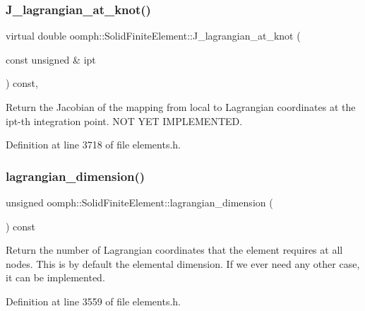\subsubsection{\texorpdfstring{J\+\_\+lagrangian\+\_\+at\+\_\+knot()}{J\_lagrangian\_at\_knot()}}
{\footnotesize\ttfamily virtual double oomph\+::\+Solid\+Finite\+Element\+::\+J\+\_\+lagrangian\+\_\+at\+\_\+knot (\begin{DoxyParamCaption}\item[{const unsigned \&}]{ipt }\end{DoxyParamCaption}) const\hspace{0.3cm}{\ttfamily [inline]}, {\ttfamily [virtual]}}



Return the Jacobian of the mapping from local to Lagrangian coordinates at the ipt-\/th integration point. N\+OT Y\+ET I\+M\+P\+L\+E\+M\+E\+N\+T\+ED. 



Definition at line 3718 of file elements.\+h.

\mbox{\label{classoomph_1_1SolidFiniteElement_a0200f8dd7b61eea84d7921e78bfbb5f9}} 
\subsubsection{\texorpdfstring{lagrangian\+\_\+dimension()}{lagrangian\_dimension()}}
{\footnotesize\ttfamily unsigned oomph\+::\+Solid\+Finite\+Element\+::lagrangian\+\_\+dimension (\begin{DoxyParamCaption}{ }\end{DoxyParamCaption}) const\hspace{0.3cm}{\ttfamily [inline]}}



Return the number of Lagrangian coordinates that the element requires at all nodes. This is by default the elemental dimension. If we ever need any other case, it can be implemented. 



Definition at line 3559 of file elements.\+h.

\mbox{\label{classoomph_1_1SolidFiniteElement_a0e74669899fe8b0ce322c0daf4ad1691}} 
